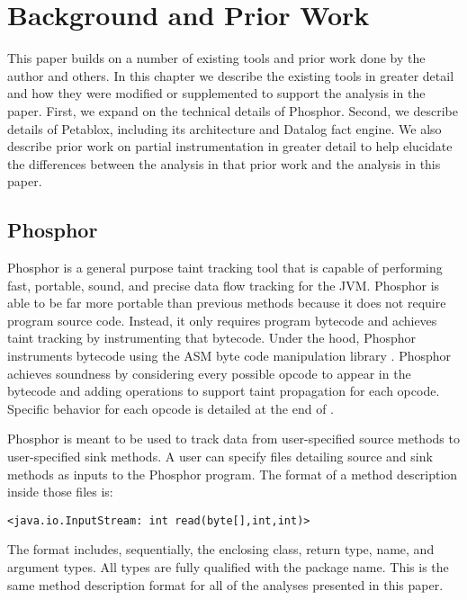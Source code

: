 \chapter{Background and Prior Work}
This paper builds on a number of existing tools and prior work done by
the author and others. In this chapter we describe the existing tools
in greater detail and how they were modified or supplemented to
support the analysis in the paper. First, we expand on the technical
details of Phosphor. Second, we describe details of Petablox,
including its architecture and Datalog fact engine. We also describe
prior work on partial instrumentation in greater detail to help
elucidate the differences between the analysis in that prior work and
the analysis in this paper.
\section{Phosphor}
Phosphor \cite{phosphor_oopsla} is a general purpose taint tracking
tool that is capable of performing fast, portable, sound, and precise
data flow tracking for the JVM. Phosphor is able to be far more
portable than previous methods because it does not require program
source code. Instead, it only requires program bytecode and achieves
taint tracking by instrumenting that bytecode. Under the hood,
Phosphor instruments bytecode using the ASM byte code manipulation
library \cite{bruneton2002asm}. Phosphor achieves soundness by
considering every possible opcode to appear in the bytecode and adding
operations to support taint propagation for each opcode. Specific
behavior for each opcode is detailed at the end of
\cite{phosphor_oopsla}.

Phosphor is meant to be used to track data from user-specified source
methods to user-specified sink methods. A user can specify files
detailing source and sink methods as inputs to the Phosphor
program. The format of a method description inside those files is:

\begin{center}
  \texttt{<java.io.InputStream: int read(byte[],int,int)>}
\end{center}

The format includes, sequentially, the enclosing class, return type,
name, and argument types. All types are fully qualified with the
package name. This is the same method description format for all of
the analyses presented in this paper.

